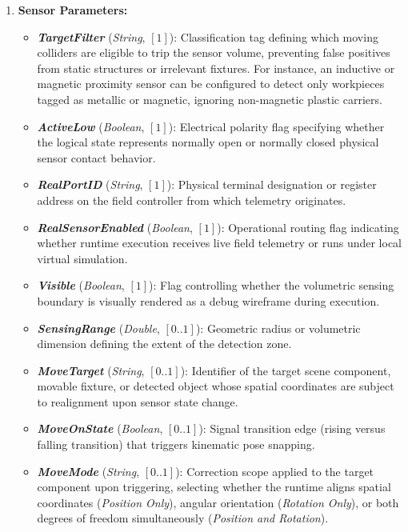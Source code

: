 \begin{itemize}
\begin{enumerate}
        \item \textbf{Sensor Parameters:}
        \begin{itemize}
            \item \textbf{\textit{TargetFilter}} (\textit{String}, $[1]$): Classification tag defining which moving colliders are eligible to trip the sensor volume, preventing false positives from static structures or irrelevant fixtures. For instance, an inductive or magnetic proximity sensor can be configured to detect only workpieces tagged as metallic or magnetic, ignoring non-magnetic plastic carriers.
            \item \textbf{\textit{ActiveLow}} (\textit{Boolean}, $[1]$): Electrical polarity flag specifying whether the logical state represents normally open or normally closed physical sensor contact behavior.
            \item \textbf{\textit{RealPortID}} (\textit{String}, $[1]$): Physical terminal designation or register address on the field controller from which telemetry originates.
            \item \textbf{\textit{RealSensorEnabled}} (\textit{Boolean}, $[1]$): Operational routing flag indicating whether runtime execution receives live field telemetry or runs under local virtual simulation.
            \item \textbf{\textit{Visible}} (\textit{Boolean}, $[1]$): Flag controlling whether the volumetric sensing boundary is visually rendered as a debug wireframe during execution.
            \item \textbf{\textit{SensingRange}} (\textit{Double}, $[0..1]$): Geometric radius or volumetric dimension defining the extent of the detection zone.
            \item \textbf{\textit{MoveTarget}} (\textit{String}, $[0..1]$): Identifier of the target scene component, movable fixture, or detected object whose spatial coordinates are subject to realignment upon sensor state change.
            \item \textbf{\textit{MoveOnState}} (\textit{Boolean}, $[0..1]$): Signal transition edge (rising versus falling transition) that triggers kinematic pose snapping.
            \item \textbf{\textit{MoveMode}} (\textit{String}, $[0..1]$): Correction scope applied to the target component upon triggering, selecting whether the runtime aligns spatial coordinates (\textit{Position Only}), angular orientation (\textit{Rotation Only}), or both degrees of freedom simultaneously (\textit{Position and Rotation}).

\end{itemize}
\end{enumerate}
\end{itemize}
